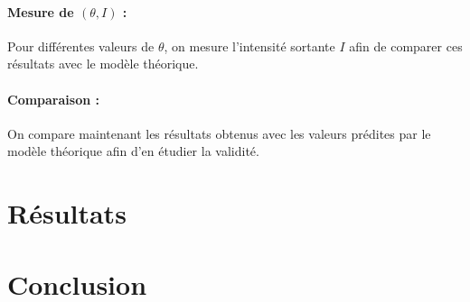 \documentclass{article}
\begin{document}
\paragraph{Mesure de $(\theta, I)$ :} Pour différentes valeurs de $\theta$, on mesure l'intensité sortante $I$ afin de comparer ces résultats avec le modèle théorique.

\paragraph{Comparaison :} On compare maintenant les résultats obtenus avec les valeurs prédites par le modèle théorique afin d'en étudier la validité.

\section{Résultats}

\section{Conclusion}
\end{document}
